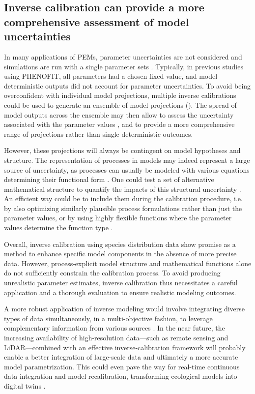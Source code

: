 \documentclass[preprint,12pt,authoryear]{elsarticle}
\begin{document}
\subsection{Inverse calibration can provide a more comprehensive assessment of model uncertainties}

In many applications of PEMs, parameter uncertainties are not considered and simulations are run with a single parameter sets \citep{Niu2014, Lobell2010}. Typically, in previous studies using PHENOFIT, all parameters had a chosen fixed value, and model deterministic outputs did not account for parameter uncertainties. To avoid being overconfident with individual model projections, multiple inverse calibrations could be used to generate an ensemble of model projections (). The spread of model outputs across the ensemble may then allow to assess the uncertainty associated with the parameter values \citep{Simmonds2024}, and to provide a more comprehensive range of projections rather than single deterministic outcomes.

However, these projections will always be contingent on model hypotheses and structure. The representation of processes in models may indeed represent a large source of uncertainty, as processes can usually be modeled with various equations determining their functional form \citep{Keenan2011}. One could test a set of alternative mathematical structure to quantify the impacts of this structural uncertainty \citep{Huber2020}. An efficient way could be to include them during the calibration procedure, i.e. by also optimizing similarly plausible process formulations rather than just the parameter values, or by using highly flexible functions where the parameter values determine the function type \citep{Chuine2000}.

Overall, inverse calibration using species distribution data show promise as a method to enhance specific model components in the absence of more precise data. However, process-explicit model structure and mathematical functions alone do not sufficiently constrain the calibration process. To avoid producing unrealistic parameter estimates, inverse calibration thus necessitates a careful application and a thorough evaluation to ensure realistic modeling outcomes. 

A more robust application of inverse modeling would involve integrating diverse types of data simultaneously, in a multi-objective fashion, to leverage complementary information from various sources \citep{Cameron2022}. In the near future, the increasing availability of high-resolution data---such as remote sensing and LiDAR---combined with an effective inverse-calibration framework will probably enable a better integration of large-scale data and ultimately a more accurate model parametrization. This could even pave the way for real-time continuous data integration and model recalibration, transforming ecological models into digital twins \citep{Koning2023}.
\end{document}
